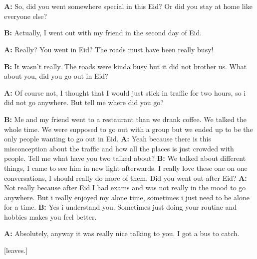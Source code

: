 \documentclass[12pt, a4paper]{article}
\newcommand{\head}[1]{
  \section*{\centering{\fonthead{#1}}}
}
\begin{document}
\head{A Conversation About Eid al-Fitr}\vspace{2em}

\textbf{A:} So, did you went somewhere special in this Eid? Or did you stay at home like everyone else?\bigbreak

\textbf{B:} Actually, I went out with my friend in the second day of Eid.\bigbreak

\textbf{A:} Really? You went in Eid? The roads must have been really busy! \bigbreak

\textbf{B:} It wasn't really. The roads were kinda busy but it did not 
brother us. What about you, did you go out in Eid? \bigbreak

\textbf{A:} Of course not, I thought that I would just stick in traffic for two hours, so i 
did not go anywhere. But tell me where did you go? \bigbreak

\textbf{B:} Me and my friend went to a restaurant than we drank coffee. We talked the whole time. 
We were supposed to go out with a group but we ended up to be the only people wanting to go out in Eid. \bigbreak
\textbf{A:} Yeah because there is this misconception about the traffic and how all the places is just crowded with people. 
Tell me what have you two talked about? \bigbreak
\textbf{B:} We talked about different things, I came to see him in new light afterwards. I really love 
these one on one conversations, I should really do more of them. Did you went out after Eid? \bigbreak
\textbf{A:} Not really because after Eid I had exams and was not really in the mood to go anywhere.
But i really enjoyed my alone time, sometimes i just need to be alone for a time. \bigbreak
\textbf{B:} Yes i understand you. Sometimes just doing your routine and hobbies makes you feel better.\bigbreak

\textbf{A:} Absolutely, anyway it was really nice talking to you. I got a bus to catch.\bigbreak

\centerline{[leaves.]}
\end{document}
